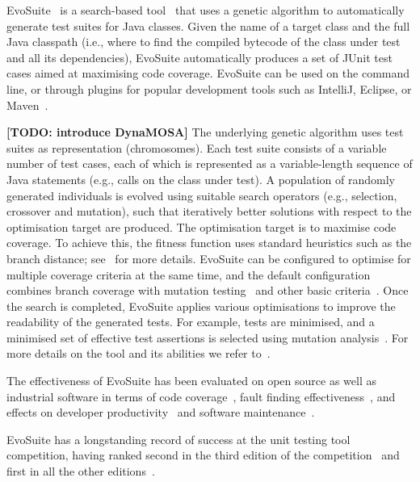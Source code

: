 \documentclass[sigconf,table]{acmart}
\newcommand{\TODO}[1]{\textbf{\textcolor{ScarletRed}{[TODO: #1]}}\xspace}
\newcommand{\TODO}[1]{}
\newcommand{\EVOSUITE}{{\sc EvoSuite}\xspace}
\begin{document}
\EVOSUITE~\cite{FrA11c} is a search-based tool~\cite{GoA_TSE12} that
uses a genetic algorithm to automatically generate test suites for
Java classes. Given the name of a target class and the full Java
classpath (i.e., where to find the compiled bytecode of the class
under test and all its dependencies), \EVOSUITE automatically produces
a set of JUnit test cases aimed at maximising code coverage. \EVOSUITE
can be used on the command line, or through plugins for popular
development tools such as IntelliJ, Eclipse, or
Maven~\cite{ICST16_Tool}.

\TODO{introduce DynaMOSA}
The underlying genetic algorithm uses test suites as representation
(chromosomes). Each test suite consists of a variable number of test
cases, each of which is represented as a variable-length sequence of
Java statements (e.g., calls on the class under test). A population of
randomly generated individuals is evolved using suitable search
operators (e.g., selection, crossover and mutation), such that
iteratively better solutions with respect to the optimisation target
are produced. The optimisation target is to maximise code coverage. To
achieve this, the fitness function uses standard heuristics such as
the branch distance; see~\cite{GoA_TSE12} for more details. \EVOSUITE
can be configured to optimise for multiple coverage criteria at the
same time, and the default configuration combines branch coverage with
mutation testing~\cite{emse14_mutation} and other basic
criteria~\cite{rojas2015combining}. Once the search is completed,
\EVOSUITE applies various optimisations to improve the readability of
the generated tests. For example, tests are minimised, and a
minimised set of effective test assertions is selected using mutation
analysis~\cite{10.1109/TSE.2011.93}. For more details on the tool and
its abilities we refer to~\cite{FrA11c,FrA13a}.


The effectiveness of \EVOSUITE has been evaluated on open source as
well as industrial software in terms of code
coverage~\cite{fraser2014large,emse_archive,ea_evaluation}, fault finding
effectiveness~\cite{shamshiri2015automatically,moein2017}, and effects
on developer
productivity~\cite{TOSEM_userstudy,ISSTA15_Study} and software
maintenance~\cite{ICST2018_Maintenance}.

\EVOSUITE has a longstanding record of success at the unit testing
tool competition, having ranked second in the third edition of the
competition~\cite{evosuiteAtSbst2015} and first in all the other
editions~\cite{evosuiteAtSbst2013,evosuiteAtFittest2013,evosuiteAtSbst2016,evosuiteAtSbst2017,evosuiteAtSbst2018}.
\end{document}
